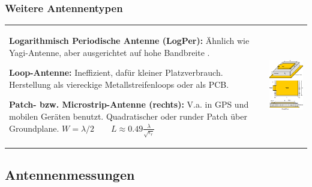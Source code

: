 \subsubsection{Weitere Antennentypen }
\begin{tabular}{ll}
\parbox{11cm}{
    \textbf{Logarithmisch Periodische Antenne (LogPer):} \\
    Ähnlich wie
    Yagi-Antenne, aber ausgerichtet auf hohe Bandbreite .\\
    
    
    \textbf{Loop-Antenne:} \\
    Ineffizient, dafür kleiner Platzverbrauch.
    Herstellung als viereckige Metallstreifenloops oder als PCB.\\
    
    
    \textbf{Patch- bzw. Microstrip-Antenne (rechts):}\\
    V.a. in GPS und mobilen Geräten benutzt. Quadratischer oder runder Patch
    über Groundplane. $W = \lambda/2 \qquad L \approx 0.49
    \frac{\lambda}{\sqrt{\epsilon_r}}$ 
    }
& \parbox{8cm}{
    \includegraphics[width=5cm]{./bilder/antennas-patch.png}
    }
\end{tabular}

\subsection{Antennenmessungen }
\newpage

